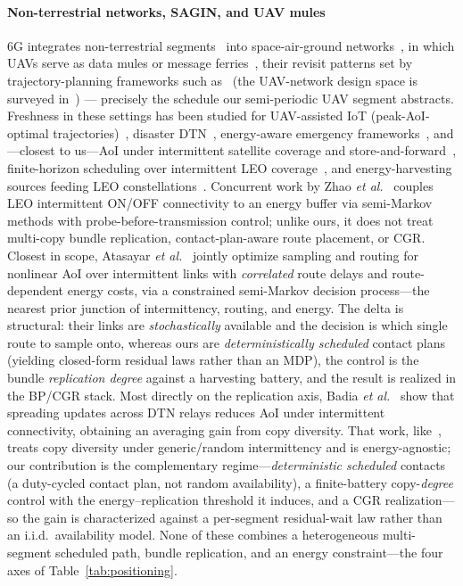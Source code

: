 \documentclass[twocolumn,3p,times,procedia]{elsarticle}
\begin{document}
\paragraph*{Non-terrestrial networks, SAGIN, and UAV mules}
6G integrates non-terrestrial segments~\cite{azari2022,giordani2021} into
space-air-ground networks~\cite{liu2018sagin}, in which UAVs serve as data
mules or message ferries~\cite{zhao2004ferry,shah2003mules}, their revisit
patterns set by trajectory-planning frameworks such
as~\cite{huang2025uav} (the UAV-network design space is surveyed
in~\cite{zhou2026uavai}) --- precisely the schedule our semi-periodic
UAV segment abstracts. Freshness in
these settings has been studied for UAV-assisted IoT (peak-AoI-optimal
trajectories)~\cite{abdelmagid2019}, disaster DTN~\cite{isayama},
energy-aware emergency frameworks~\cite{e3f}, and---closest to us---AoI
under intermittent satellite coverage and store-and-forward~\cite{ari},
finite-horizon scheduling over intermittent LEO coverage~\cite{badia2025},
and energy-harvesting sources feeding LEO constellations~\cite{delfani2025}.
Concurrent work by Zhao \emph{et al.}~\cite{zhao2026aoi} couples LEO
intermittent ON/OFF connectivity to an energy buffer via semi-Markov
methods with probe-before-transmission control; unlike ours, it does
not treat multi-copy bundle replication, contact-plan-aware route
placement, or CGR. Closest in scope, Atasayar
\emph{et al.}~\cite{atasayar2025} jointly
optimize sampling and routing for nonlinear AoI over intermittent links
with \emph{correlated} route delays and route-dependent energy costs,
via a constrained semi-Markov decision process---the nearest prior
junction of intermittency, routing, and energy. The delta is
structural: their links are \emph{stochastically} available and the
decision is which single route to sample onto, whereas ours are
\emph{deterministically scheduled} contact plans (yielding closed-form
residual laws rather than an MDP), the control is the bundle
\emph{replication degree} against a harvesting battery, and the result
is realized in the BP/CGR stack. Most directly on the replication axis,
Badia \emph{et al.}~\cite{badia2025globecom} show that
spreading updates across DTN relays reduces AoI under intermittent
connectivity, obtaining an averaging gain from copy diversity. That work,
like~\cite{kam2016}, treats copy diversity under generic/random
intermittency and is energy-agnostic; our contribution is the complementary
regime---\emph{deterministic scheduled} contacts (a duty-cycled contact
plan, not random availability), a finite-battery copy-\emph{degree} control
with the energy--replication threshold it induces, and a CGR realization---
so the gain is characterized against a per-segment residual-wait law rather
than an i.i.d.\ availability model. None of these combines a heterogeneous
multi-segment scheduled path, bundle replication, and an energy
constraint---the four axes of Table~\ref{tab:positioning}.
\end{document}
